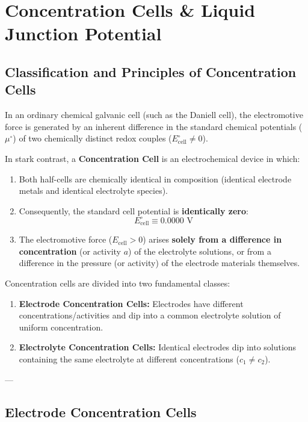 \chapter{Concentration Cells \& Liquid Junction Potential}
\label{chap:concentration_cells_ljp}

\section{Classification and Principles of Concentration Cells}

In an ordinary chemical galvanic cell (such as the Daniell cell), the electromotive force is generated by an inherent difference in the standard chemical potentials ($\mu^\circ$) of two chemically distinct redox couples ($E^\circ_{\text{cell}} \neq 0$).

In stark contrast, a \textbf{Concentration Cell} is an electrochemical device in which:
\begin{enumerate}[leftmargin=*]
    \item Both half-cells are chemically identical in composition (identical electrode metals and identical electrolyte species).
    \item Consequently, the standard cell potential is \textbf{identically zero}:
    \begin{equation}
        \boxed{E^\circ_{\text{cell}} \equiv 0.0000\text{ V}}
    \end{equation}
    \item The electromotive force ($E_{\text{cell}} > 0$) arises \textbf{solely from a difference in concentration} (or activity $a$) of the electrolyte solutions, or from a difference in the pressure (or activity) of the electrode materials themselves.
\end{enumerate}

Concentration cells are divided into two fundamental classes:
\begin{enumerate}
    \item \textbf{Electrode Concentration Cells:} Electrodes have different concentrations/activities and dip into a common electrolyte solution of uniform concentration.
    \item \textbf{Electrolyte Concentration Cells:} Identical electrodes dip into solutions containing the same electrolyte at different concentrations ($c_1 \neq c_2$).
\end{enumerate}

---

\section{Electrode Concentration Cells}

